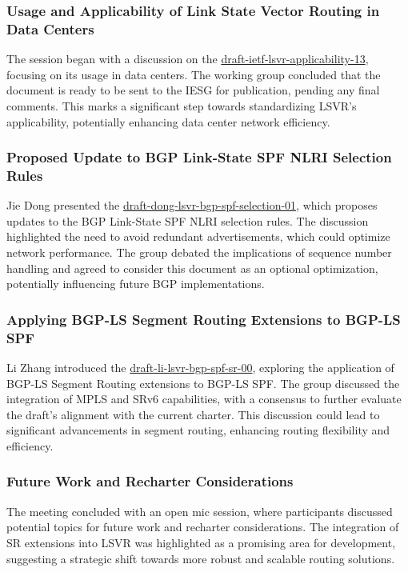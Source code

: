 \documentclass{article}
\begin{document}
\subsubsection{Usage and Applicability of Link State Vector Routing in Data Centers}
The session began with a discussion on the \href{https://datatracker.ietf.org/doc/html/draft-ietf-lsvr-applicability-13}{draft-ietf-lsvr-applicability-13}, focusing on its usage in data centers. The working group concluded that the document is ready to be sent to the IESG for publication, pending any final comments. This marks a significant step towards standardizing LSVR's applicability, potentially enhancing data center network efficiency.

\subsubsection{Proposed Update to BGP Link-State SPF NLRI Selection Rules}
Jie Dong presented the \href{https://datatracker.ietf.org/doc/html/draft-dong-lsvr-bgp-spf-selection-01}{draft-dong-lsvr-bgp-spf-selection-01}, which proposes updates to the BGP Link-State SPF NLRI selection rules. The discussion highlighted the need to avoid redundant advertisements, which could optimize network performance. The group debated the implications of sequence number handling and agreed to consider this document as an optional optimization, potentially influencing future BGP implementations.

\subsubsection{Applying BGP-LS Segment Routing Extensions to BGP-LS SPF}
Li Zhang introduced the \href{https://datatracker.ietf.org/doc/html/draft-li-lsvr-bgp-spf-sr-00}{draft-li-lsvr-bgp-spf-sr-00}, exploring the application of BGP-LS Segment Routing extensions to BGP-LS SPF. The group discussed the integration of MPLS and SRv6 capabilities, with a consensus to further evaluate the draft's alignment with the current charter. This discussion could lead to significant advancements in segment routing, enhancing routing flexibility and efficiency.

\subsubsection{Future Work and Recharter Considerations}
The meeting concluded with an open mic session, where participants discussed potential topics for future work and recharter considerations. The integration of SR extensions into LSVR was highlighted as a promising area for development, suggesting a strategic shift towards more robust and scalable routing solutions.
\end{document}

